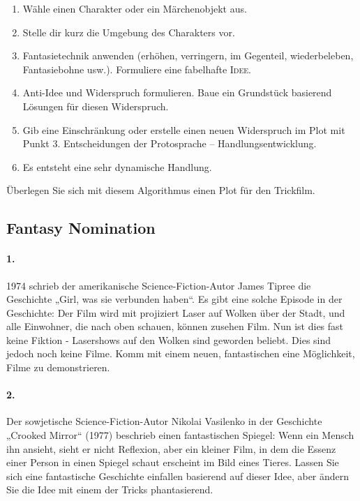 \documentclass[11pt,a4paper]{article}
\begin{document}
\begin{enumerate}
\item Wähle einen Charakter oder ein Märchenobjekt aus.
\item Stelle dir kurz die Umgebung des Charakters vor.
\item Fantasietechnik anwenden (erhöhen, verringern, im Gegenteil,
  wiederbeleben, Fantasiebohne usw.). Formuliere eine fabelhafte
  \textsc{Idee}.
\item Anti-Idee und Widerspruch formulieren. Baue ein Grundstück basierend
  Lösungen für diesen Widerspruch.
\item Gib eine Einschränkung oder erstelle einen neuen Widerspruch im Plot mit
  Punkt 3. Entscheidungen der Protosprache -- Handlungsentwicklung.
\item Es entsteht eine sehr dynamische Handlung.
\end{enumerate}
Überlegen Sie sich mit diesem Algorithmus einen Plot für den Trickfilm.

\subsection*{Fantasy Nomination}

\paragraph{1.}
1974 schrieb der amerikanische Science-Fiction-Autor James Tipree die
Geschichte „Girl, was sie verbunden haben“. Es gibt eine solche Episode in
der Geschichte: Der Film wird mit projiziert Laser auf Wolken über der Stadt,
und alle Einwohner, die nach oben schauen, können zusehen Film. Nun ist dies
fast keine Fiktion - Lasershows auf den Wolken sind geworden beliebt. Dies
sind jedoch noch keine Filme. Komm mit einem neuen, fantastischen eine
Möglichkeit, Filme zu demonstrieren.

\paragraph{2.}
Der sowjetische Science-Fiction-Autor Nikolai Vasilenko in der Geschichte
„Crooked Mirror“ (1977) beschrieb einen fantastischen Spiegel: Wenn ein Mensch
ihn ansieht, sieht er nicht Reflexion, aber ein kleiner Film, in dem die
Essenz einer Person in einen Spiegel schaut erscheint im Bild eines
Tieres. Lassen Sie sich eine fantastische Geschichte einfallen basierend auf
dieser Idee, aber ändern Sie die Idee mit einem der Tricks phantasierend.
\end{document}
